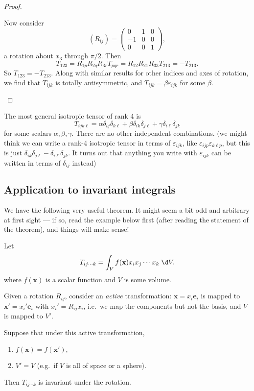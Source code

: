 \documentclass[a4paper]{article}
\begin{document}
\begin{proof}
\begin{enumerate}
      Now consider
      \[
        (R_{ij}) =
        \begin{pmatrix}
          0 & 1 & 0\\
          -1 & 0 & 0\\
          0 & 0 & 1
        \end{pmatrix},
      \]
      a rotation about $x_3$ through $\pi/2$. Then
      \[
        T_{123} = R_{1p}R_{2q}R_{3r}T_{pqr} = R_{12}R_{21}R_{33}T_{213} =-T_{213}.
      \]
      So $T_{123} = -T_{213}$. Along with similar results for other indices and axes of rotation, we find that $T_{ijk}$ is totally antisymmetric, and $T_{ijk} = \beta \varepsilon_{ijk}$ for some $\beta$.
  \end{enumerate}
\end{proof}
\begin{eg}
  The most general isotropic tensor of rank 4 is
  \[
    T_{ijk\ell} = \alpha \delta_{ij}\delta_{k\ell} + \beta \delta_{ik}\delta_{j\ell} + \gamma \delta_{i\ell}\delta_{jk}
  \]
  for some scalars $\alpha, \beta, \gamma$. There are no other independent combinations. (we might think we can write a rank-4 isotropic tensor in terms of $\varepsilon_{ijk}$, like $\varepsilon_{ijp}\varepsilon_{k\ell p}$, but this is just $\delta_{ik}\delta_{j\ell} - \delta_{i\ell}\delta_{jk}$. It turns out that anything you write with $\varepsilon_{ijk}$ can be written in terms of $\delta_{ij}$ instead)
\end{eg}

\subsection{Application to invariant integrals}
We have the following very useful theorem. It might seem a bit odd and arbitrary at first sight --- if so, read the example below first (after reading the statement of the theorem), and things will make sense!
\begin{thm}
  Let
  \[
    T_{ij\cdots k} = \int_V f(\mathbf{x}) x_i x_j \cdots x_k\;\d V.
  \]
  where $f(\mathbf{x})$ is a scalar function and $V$ is some volume.

  Given a rotation $R_{ij}$, consider an \emph{active} transformation: $\mathbf{x} = x_i \mathbf{e}_i$ is mapped to $\mathbf{x}' = x_i' \mathbf{e}_i$ with $x_i' = R_{ij} x_i$, i.e.\ we map the components but not the basis, and $V$ is mapped to $V'$.

  Suppose that under this active transformation,
  \begin{enumerate}
    \item $f(\mathbf{x}) = f(\mathbf{x}')$,
    \item $V' = V$ (e.g.\ if $V$ is all of space or a sphere).
  \end{enumerate}
  Then $T_{ij\cdots k}$ is invariant under the rotation.
\end{thm}
\end{document}
